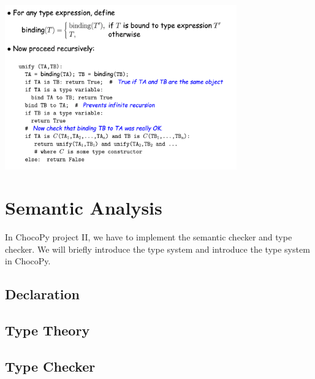 \documentclass[a4paper]{exam}
\theoremstyle{definition}
\begin{document}
\includegraphics[width=10cm]{img/Snipaste_2021-05-08_04-55-14.png}

\section{Semantic Analysis}
In ChocoPy project II, we have to implement the semantic checker and type checker. We will briefly introduce the type system and introduce the type system in ChocoPy.

\subsection{Declaration}

\subsection{Type Theory}

\subsection{Type Checker }

\printbibliography
\end{document}
